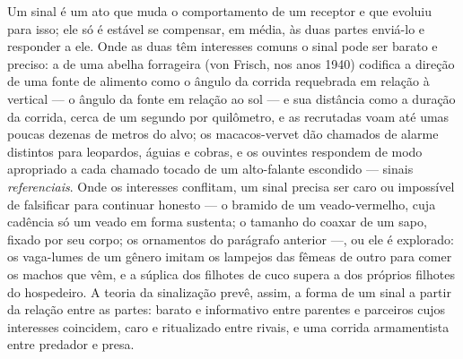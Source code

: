 \begin{proposition}\label{prop:b3:behavioural-ecology:signals}
Um sinal é um ato que muda o comportamento de um receptor e que evoluiu
para isso; ele só é estável se compensar, em média, às duas partes
enviá-lo e responder a ele. Onde as duas têm interesses comuns o sinal
pode ser barato e preciso: a \emph{} de uma abelha
forrageira (von Frisch, nos anos 1940) codifica a direção de uma fonte de
alimento como o ângulo da corrida requebrada em relação à vertical --- o
ângulo da fonte em relação ao sol --- e sua distância como a duração da
corrida, cerca de um segundo por quilômetro, e as recrutadas voam até
umas poucas dezenas de metros do alvo; os macacos-vervet dão chamados de
alarme distintos para leopardos, águias e cobras, e os ouvintes respondem
de modo apropriado a cada chamado tocado de um alto-falante escondido ---
sinais \emph{referenciais}. Onde os interesses conflitam, um sinal
precisa ser caro ou impossível de falsificar para continuar honesto ---
o bramido de um veado-vermelho, cuja cadência só um veado em forma
sustenta; o tamanho do coaxar de um sapo, fixado por seu corpo; os
ornamentos do parágrafo anterior ---, ou ele é explorado: os vaga-lumes
de um gênero imitam os lampejos das fêmeas de outro para comer os machos
que vêm, e a súplica dos filhotes de cuco supera a dos próprios filhotes
do hospedeiro. A teoria da sinalização prevê, assim, a forma de um sinal
a partir da relação entre as partes: barato e informativo entre parentes
e parceiros cujos interesses coincidem, caro e ritualizado entre rivais,
e uma corrida armamentista entre predador e presa.
\end{proposition}
\admitted

